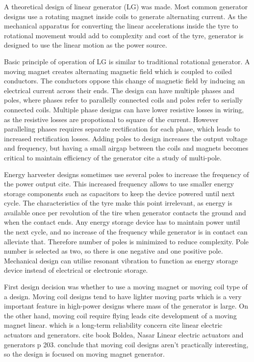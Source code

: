 A theoretical design of linear generator (LG) was made. Most common generator designs use a rotating magnet inside coils to generate alternating current. As the mechanical apparatus for converting the linear accelerations inside the tyre to rotational movement would add to complexity and cost of the tyre, generator is designed to use the linear motion as the power source.

Basic principle of operation of LG is similar to traditional rotational generator. A moving magnet creates alternating magnetic field which is coupled to coiled conductors. The conductors oppose this change of magnetic field by inducing an electrical current across their ends. The design can have multiple phases and poles, where phases refer to parallelly connected coils and poles refer to serially connected coils. Multiple phase designs can have lower resistive losses in wiring, as the resistive losses are propotional to square of the current. However paralleling phases requires separate rectification for each phase, which leads to increased rectification losses. Adding poles to design increases the output voltage and frequency, but having a small airgap between the coils and magnets becomes critical to maintain efficiency of the generator{\color{red} cite a study of multi-pole}. 

Energy harvester designs sometimes use several poles to increase the frequency of the power output {\color{red}cite}. This increased frequency allows to use smaller energy storage components such as capacitors to keep the device powered until next cycle. The characteristics of the tyre make this point irrelevant, as energy is available once per revolution of the tire when generator contacts the ground and when the contact ends. Any energy storage device has to maintain power until the next cycle, and no increase of the frequency while generator is in contact can alleviate that. Therefore number of poles is minimized to reduce complexity. Pole number is selected as two, so there is one negative and one positive pole. Mechanical design can utilise resonant vibration to function as energy storage device instead of electrical or electronic storage.

First design decision was whether to use a moving magnet or moving coil type of a design. Moving coil designs tend to have lighter moving parts which is a very important feature in high-power designs where mass of the generator is large. On the other hand, moving coil require flying leads  {\color{red} cite development of a moving magnet linear}.  which is a long-term reliability concern  {\color{red} cite linear electric actuators and generators}.  {\color{red} cite book Boldea, Nasar Linear electric actuators and generators p 203}. conclude that moving coil designs aren't practically interesting, so the design is focused on moving magnet generator. 

